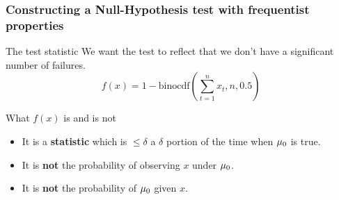 \begin{frame}
  \frametitle{Constructing a Null-Hypothesis test with frequentist properties}
  \begin{block}{The test statistic}
    We want the test to reflect that we don't have a significant number of failures.
    \[
      f(x) = 1 - \textrm{binocdf}(\sum_{t=1}^n x_t, n, 0.5)
    \]
  \end{block}
  \begin{alertblock}{What $f(x)$ is and is not}
    \begin{itemize}
    \item It is a \textbf{statistic} which is $\leq \delta$ a $\delta$ portion of the time when $\mu_0$ is true.
    \item It is \textbf{not} the probability of observing $x$ under $\mu_0$.
    \item It is \textbf{not} the probability of $\mu_0$ given $x$.
    \end{itemize}
  \end{alertblock}
\end{frame}
